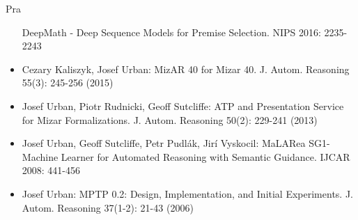\begin{sitedescription}{Pra}
\begin{itemize}
DeepMath - Deep Sequence Models for Premise Selection. NIPS 2016: 2235-2243
\item Cezary Kaliszyk, Josef Urban:
MizAR 40 for Mizar 40. J. Autom. Reasoning 55(3): 245-256 (2015)
\item Josef Urban, Piotr Rudnicki, Geoff Sutcliffe:
ATP and Presentation Service for Mizar Formalizations. J. Autom. Reasoning 50(2): 229-241 (2013)
\item Josef Urban, Geoff Sutcliffe, Petr Pudlák, Jirí Vyskocil:
MaLARea SG1- Machine Learner for Automated Reasoning with Semantic Guidance. IJCAR 2008: 441-456
\item Josef Urban:
MPTP 0.2: Design, Implementation, and Initial Experiments. J. Autom. Reasoning 37(1-2): 21-43 (2006)
\end{itemize}



\end{sitedescription}

